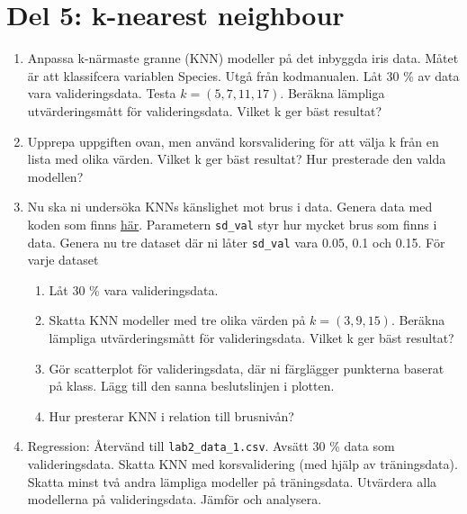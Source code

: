 \documentclass[a4paper]{article}
\begin{document}
\section*{Del 5: k-nearest neighbour}    
  \begin{enumerate}
  
  \item Anpassa k-närmaste granne (KNN) modeller på det inbyggda iris data. Måtet är att klassifcera variablen Species. Utgå från kodmanualen. Låt 30 \% av data vara valideringsdata. Testa $ k=\left(5,7,11,17\right) $. Beräkna lämpliga utvärderingsmått för valideringsdata. Vilket k ger bäst resultat?
  \item Upprepa uppgiften ovan, men använd korsvalidering för att välja k från en lista med olika värden. Vilket k ger bäst resultat? Hur presterade den valda modellen? 
  \item Nu ska ni undersöka KNNs känslighet mot brus i data. Genera data med koden som finns \href{https://github.com/STIMALiU/732G12_DM/blob/master/labs/KNN_noise_data.R}{här}. Parametern \texttt{sd\_val} styr hur mycket brus som finns i data. Genera nu tre dataset där ni låter \texttt{sd\_val} vara 0.05, 0.1 och 0.15. För varje dataset\:
    
    \begin{enumerate}
    
    \item Låt 30 \% vara valideringsdata.
    \item Skatta KNN modeller med tre olika värden på $k=\left(3,9,15\right)$. Beräkna lämpliga utvärderingsmått för valideringsdata. Vilket k ger bäst resultat?
    \item Gör scatterplot för valideringsdata, där ni färglägger punkterna baserat på klass. Lägg till den sanna beslutslinjen i plotten.
    \item Hur presterar KNN i relation till brusnivån?
    
    \end{enumerate}
  
  \item Regression: Återvänd till \texttt{lab2\_data\_1.csv}. Avsätt 30 \% data som valideringsdata. Skatta KNN med korsvalidering (med hjälp av träningsdata). Skatta minst två andra lämpliga modeller på träningsdata. Utvärdera alla modellerna på valideringsdata. Jämför och analysera.
  
  \end{enumerate}
\end{document}
